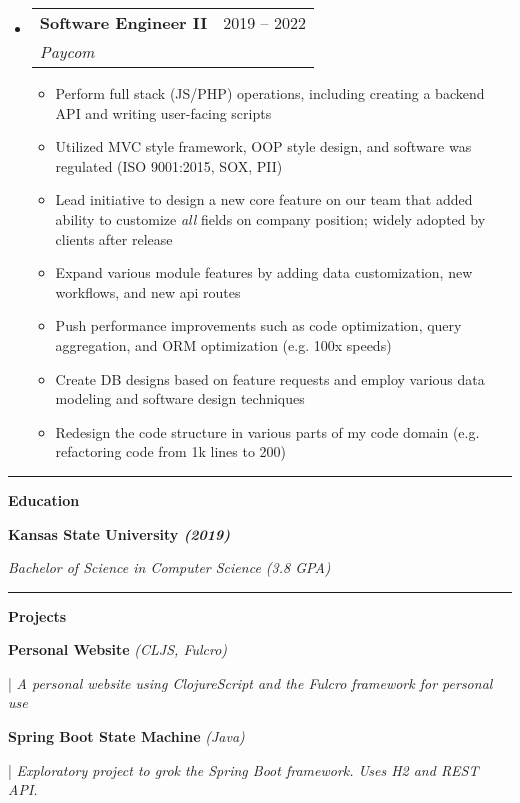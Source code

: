 \documentclass[letterpaper,11pt]{article}
\makeatletter
\newcommand{\resumeItem}[1]{
  \item\small{
    {#1 \vspace{-2pt}}
  }
}
\newcommand{\resumeSubheading}[4]{
  \vspace{-2pt}\item
    \begin{tabular*}{0.97\textwidth}[t]{l@{\extracolsep{\fill}}r}
      \textbf{#1} & #2 \\
      \textit{\small#3} & \textit{\small #4} \\
    \end{tabular*}\vspace{0pt}
}
\newcommand{\resumeSubHeadingListStart}{\begin{itemize}[leftmargin=0.15cm, label={}]}
\newcommand{\resumeSubHeadingListEnd}{\end{itemize}}
\newcommand{\resumeItemListStart}{\begin{itemize}}
\newcommand{\resumeItemListEnd}{\end{itemize}\vspace{-5pt}}
\makeatother
\begin{document}
\resumeSubHeadingListStart
\resumeSubheading
{Software Engineer II}{2019 – 2022}
{Paycom}{}
\resumeItemListStart
\resumeItem{Perform full stack (JS/PHP) operations, including creating a backend API and writing user-facing scripts}
\resumeItem{Utilized MVC style framework, OOP style design, and software was regulated (ISO 9001:2015, SOX, PII)}
\resumeItem{Lead initiative to design a new core feature on our team that added ability to customize \textit{all} fields on company position; widely adopted by clients after release }
\resumeItem{Expand various module features by adding data customization, new workflows, and new api routes}
\resumeItem{Push performance improvements such as code optimization, query aggregation, and ORM optimization (e.g. 100x speeds)}
\resumeItem{Create DB designs based on feature requests and employ various data modeling and software design techniques}
\resumeItem{Redesign the code structure in various parts of my code domain (e.g. refactoring code from 1k lines to 200)}
\resumeItemListEnd
\resumeSubHeadingListEnd
\noindent\rule{19.5cm}{0.4pt}

\textbf{\large \textcolor{magic_blue}{Education}}

\begin{minipage}[t]{0.45\textwidth}
    \raggedright
    \textbf{ Kansas State University \textit{(2019)}} \\
\end{minipage}
\hfill
\begin{minipage}[t]{0.45\textwidth}
    \raggedleft
    \textit{Bachelor of Science in Computer Science (3.8 GPA)} \\
\end{minipage}
\noindent\rule{19.5cm}{0.4pt}

\textbf{\large \textcolor{magic_blue}{Projects}}

\begin{minipage}[t]{0.28\textwidth}
	\raggedright
	\textbf{ Personal Website }\textit{(CLJS, Fulcro)} \\
\end{minipage}
\hfill
\begin{minipage}[t]{0.70\textwidth}
	\raggedright
	|\textit{ A personal website using ClojureScript and the Fulcro framework for personal use} \\
\end{minipage}

\begin{minipage}[t]{0.28\textwidth}
	\raggedright
	\textbf{ Spring Boot State Machine }\textit{(Java)} \\
\end{minipage}
\hfill
\begin{minipage}[t]{0.70\textwidth}
	\raggedright
	|\textit{ Exploratory project to grok the Spring Boot framework. Uses H2 and REST API.} \\
\end{minipage}
\end{document}
